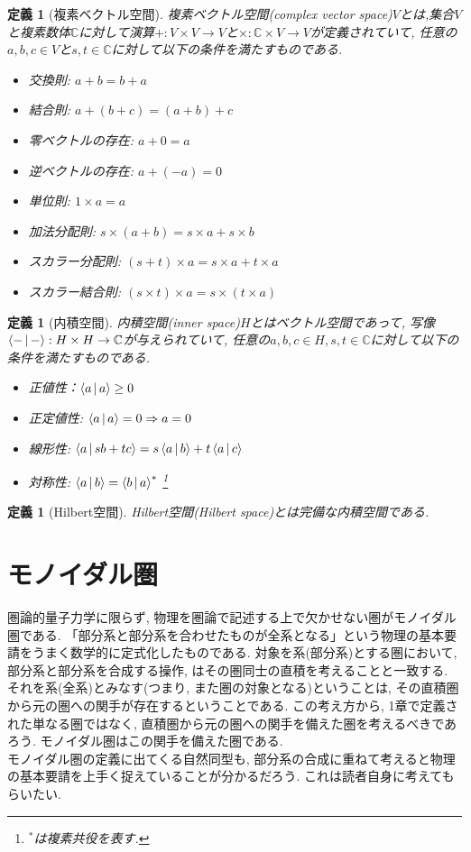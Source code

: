 \documentclass[a4paper,12pt]{ltjsarticle}
\theoremstyle{break}
\newtheorem{defn}[thm]{定義}
\newcommand{\mbc}{\mathbb{C}}
\newcommand{\ra}{\Rightarrow}
\newcommand{\ti}{\times}
\numberwithin{equation}{section}
\begin{document}
\begin{defn}[複素ベクトル空間]
  複素ベクトル空間(complex vector space)$V$とは,集合$V$と複素数体$\mbc$に対して演算$+: V \ti V \to V$と$\ti: \mbc \ti V \to V$が定義されていて, 任意の$a, b, c \in V$と$s,t \in \mbc$に対して以下の条件を満たすものである. 
  \begin{itemize}
    \item 交換則: $a + b = b + a$
    \item 結合則: $a + (b + c) = (a + b) + c$
    \item 零ベクトルの存在: $a + 0 = a$
    \item 逆ベクトルの存在: $a + (-a) = 0$
    \item 単位則: $1 \ti a = a$
    \item 加法分配則: $s \ti (a + b) = s \ti a + s \ti b$
    \item スカラー分配則: $(s + t) \ti a = s \ti a + t \ti a$
    \item スカラー結合則:  $(s \ti t) \ti a = s \ti (t \ti a)$
  \end{itemize}
\end{defn}

\begin{defn}[内積空間]
  内積空間(inner space)$H$とはベクトル空間であって, 写像$\Braket{-|-}: H \ti H \to \mbc$が与えられていて, 任意の$a,b,c \in H, s,t \in \mbc$に対して以下の条件を満たすものである. 
  \begin{itemize}
    \item 正値性：$\Braket{a|a} \geq 0$
    \item 正定値性: $\Braket{a|a}=0 \ra a=0$
    \item 線形性: $\Braket{a|sb+tc} = s\Braket{a|b}+t\Braket{a|c}$
    \item 対称性: $\Braket{a|b}=\Braket{b|a}^*$
    \footnote{
      ${}^*$は複素共役を表す. 
    }
  \end{itemize}
\end{defn}

\begin{defn}[Hilbert空間]
  Hilbert空間(Hilbert space)とは完備な内積空間である. 
\end{defn}  

\newpage

\section{モノイダル圏}

圏論的量子力学に限らず, 物理を圏論で記述する上で欠かせない圏がモノイダル圏である. 
「部分系と部分系を合わせたものが全系となる」という物理の基本要請をうまく数学的に定式化したものである. 
対象を系(部分系)とする圏において, 部分系と部分系を合成する操作, はその圏同士の直積を考えることと一致する. 
それを系(全系)とみなす(つまり, また圏の対象となる)ということは, その直積圏から元の圏への関手が存在するということである. 
この考え方から, 1章で定義された単なる圏ではなく, 直積圏から元の圏への関手を備えた圏を考えるべきであろう. 
モノイダル圏はこの関手を備えた圏である. \\
モノイダル圏の定義に出てくる自然同型も, 部分系の合成に重ねて考えると物理の基本要請を上手く捉えていることが分かるだろう. 
これは読者自身に考えてもらいたい.  
\end{document}
